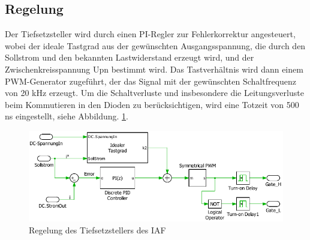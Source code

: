 	\subsection{Regelung}
		Der Tiefsetzsteller wird durch einen PI-Regler zur Fehlerkorrektur angesteuert, wobei der ideale Tastgrad aus der gewünschten Ausgangsspannung, die durch den Sollstrom und den bekannten Lastwiderstand erzeugt wird, und der Zwischenkreisspannung \gls{Upn} bestimmt wird. Das Tastverhältnis wird dann einem PWM-Generator zugeführt, der das Signal mit der gewünschten Schaltfrequenz von 20 kHz erzeugt. Um die Schaltverluste und insbesondere die Leitungsverluste beim Kommutieren in den Dioden zu berücksichtigen, wird eine Totzeit von 500 \si{\nano \second} eingestellt, siehe Abbildung. \ref{fig:iafbuckcontrol}.
		\begin{figure}[H]
			\centering
			\includegraphics[width=0.9\linewidth]{content/Grafiken/IAF_BuckControl}
			\caption{Regelung des Tiefsetzstellers des IAF}
			\label{fig:iafbuckcontrol}
		\end{figure}
		
